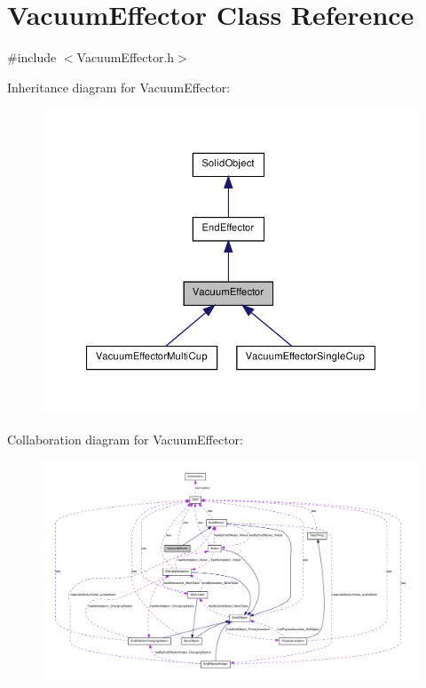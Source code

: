 \hypertarget{class_vacuum_effector}{
\section{VacuumEffector Class Reference}
\label{class_vacuum_effector}
}


{\ttfamily \#include $<$VacuumEffector.h$>$}



Inheritance diagram for VacuumEffector:\nopagebreak
\begin{figure}[H]
\begin{center}
\leavevmode
\includegraphics[width=340pt]{class_vacuum_effector__inherit__graph}
\end{center}
\end{figure}


Collaboration diagram for VacuumEffector:\nopagebreak
\begin{figure}[H]
\begin{center}
\leavevmode
\includegraphics[width=400pt]{class_vacuum_effector__coll__graph}
\end{center}
\end{figure}
